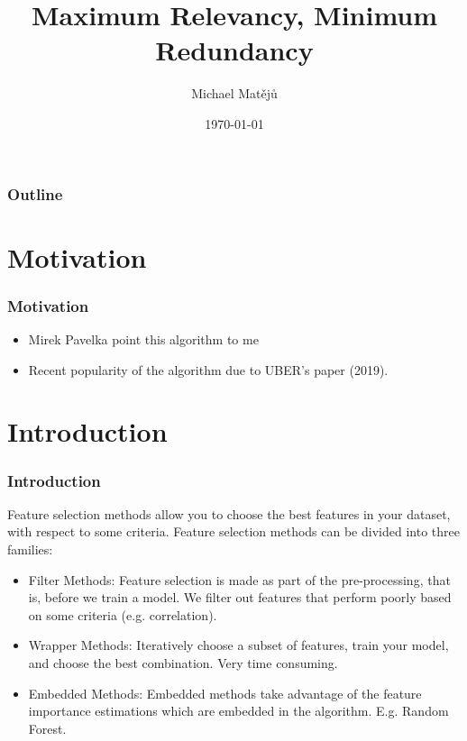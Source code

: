 \documentclass{beamer}
\title[MRMR]{Maximum Relevancy, Minimum Redundancy}
\author{Michael Mat\v{e}j\r{u}}
\institute[KB]{AI Squad}
\date{\today}
\begin{document}
    \begin{frame}
        \titlepage
    \end{frame}

    \begin{frame}
        \frametitle{Outline}
        \tableofcontents
    \end{frame}


    \section{Motivation}
    \begin{frame}
        \frametitle{Motivation}
        \begin{itemize}
            \item Mirek Pavelka point this algorithm to me
            \pause
            \item Recent popularity of the algorithm due to UBER's paper (2019).
        \end{itemize}
    \end{frame}


    \section{Introduction}
    \begin{frame}
        \frametitle{Introduction}
        Feature selection methods allow you to choose the best features in your dataset, with
        respect to some criteria. Feature selection methods can be divided into three families:
        \pause
        \begin{itemize}
            \item Filter Methods: Feature selection is made as part of the pre-processing, that
            is, before we train a model. We filter out features that perform poorly based on some
            criteria (e.g. correlation).
            \pause
            \item Wrapper Methods: Iteratively choose a subset of features, train your model,
            and choose the best combination. Very time consuming.
            \pause
            \item Embedded Methods: Embedded methods take advantage of the feature importance
            estimations which are embedded in the algorithm. E.g. Random Forest.
        \end{itemize}
    \end{frame}
\end{document}
